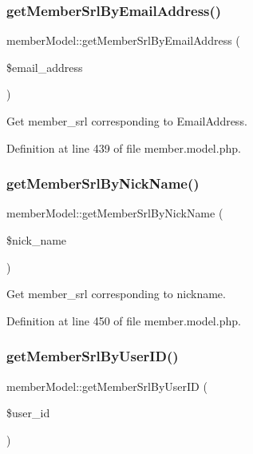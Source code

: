 \subsubsection{\texorpdfstring{get\+Member\+Srl\+By\+Email\+Address()}{getMemberSrlByEmailAddress()}}
{\footnotesize\ttfamily member\+Model\+::get\+Member\+Srl\+By\+Email\+Address (\begin{DoxyParamCaption}\item[{}]{\$email\+\_\+address }\end{DoxyParamCaption})}



Get member\+\_\+srl corresponding to Email\+Address. 



Definition at line 439 of file member.\+model.\+php.

\mbox{\label{classmemberModel_af83e783a285b244a510a8dc7662c80cf}} 
\subsubsection{\texorpdfstring{get\+Member\+Srl\+By\+Nick\+Name()}{getMemberSrlByNickName()}}
{\footnotesize\ttfamily member\+Model\+::get\+Member\+Srl\+By\+Nick\+Name (\begin{DoxyParamCaption}\item[{}]{\$nick\+\_\+name }\end{DoxyParamCaption})}



Get member\+\_\+srl corresponding to nickname. 



Definition at line 450 of file member.\+model.\+php.

\mbox{\label{classmemberModel_a4f548037aabac6d09b42c1a7f81311ee}} 
\subsubsection{\texorpdfstring{get\+Member\+Srl\+By\+User\+I\+D()}{getMemberSrlByUserID()}}
{\footnotesize\ttfamily member\+Model\+::get\+Member\+Srl\+By\+User\+ID (\begin{DoxyParamCaption}\item[{}]{\$user\+\_\+id }\end{DoxyParamCaption})}



